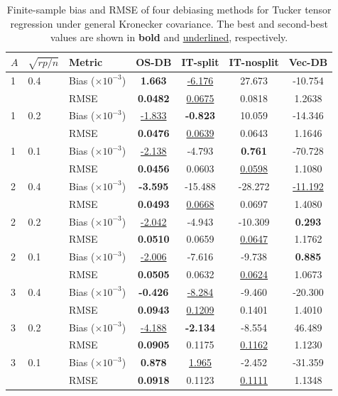 \begin{table}[!htbp]
\centering
\caption{Finite-sample bias and RMSE of four debiasing methods for Tucker tensor regression under general Kronecker covariance. The best and second-best values are shown in \textbf{bold} and \underline{underlined}, respectively.}
\label{tab:tsr-methods-general}
\begin{threeparttable}
\setlength{\tabcolsep}{4pt}
\begin{tabular}{lllcccc}
\toprule
$A$ & $\sqrt{rp/n}$ & Metric & OS-DB & IT-split & IT-nosplit & Vec-DB \\
\midrule
1 & 0.4 & Bias ($\times 10^{-3}$) & \textbf{1.663} & \underline{-6.176} & 27.673 & -10.754 \\
 &  & RMSE & \textbf{0.0482} & \underline{0.0675} & 0.0818 & 1.2638 \\
1 & 0.2 & Bias ($\times 10^{-3}$) & \underline{-1.833} & \textbf{-0.823} & 10.059 & -14.346 \\
 &  & RMSE & \textbf{0.0476} & \underline{0.0639} & 0.0643 & 1.1646 \\
1 & 0.1 & Bias ($\times 10^{-3}$) & \underline{-2.138} & -4.793 & \textbf{0.761} & -70.728 \\
 &  & RMSE & \textbf{0.0456} & 0.0603 & \underline{0.0598} & 1.1080 \\
\midrule
2 & 0.4 & Bias ($\times 10^{-3}$) & \textbf{-3.595} & -15.488 & -28.272 & \underline{-11.192} \\
 &  & RMSE & \textbf{0.0493} & \underline{0.0668} & 0.0697 & 1.4080 \\
2 & 0.2 & Bias ($\times 10^{-3}$) & \underline{-2.042} & -4.943 & -10.309 & \textbf{0.293} \\
 &  & RMSE & \textbf{0.0510} & 0.0659 & \underline{0.0647} & 1.1762 \\
2 & 0.1 & Bias ($\times 10^{-3}$) & \underline{-2.006} & -7.616 & -9.738 & \textbf{0.885} \\
 &  & RMSE & \textbf{0.0505} & 0.0632 & \underline{0.0624} & 1.0673 \\
\midrule
3 & 0.4 & Bias ($\times 10^{-3}$) & \textbf{-0.426} & \underline{-8.284} & -9.460 & -20.300 \\
 &  & RMSE & \textbf{0.0943} & \underline{0.1209} & 0.1401 & 1.4010 \\
3 & 0.2 & Bias ($\times 10^{-3}$) & \underline{-4.188} & \textbf{-2.134} & -8.554 & 46.489 \\
 &  & RMSE & \textbf{0.0905} & 0.1175 & \underline{0.1162} & 1.1230 \\
3 & 0.1 & Bias ($\times 10^{-3}$) & \textbf{0.878} & \underline{1.965} & -2.452 & -31.359 \\
 &  & RMSE & \textbf{0.0918} & 0.1123 & \underline{0.1111} & 1.1348 \\
\bottomrule
\end{tabular} 
\end{threeparttable}
\end{table}
